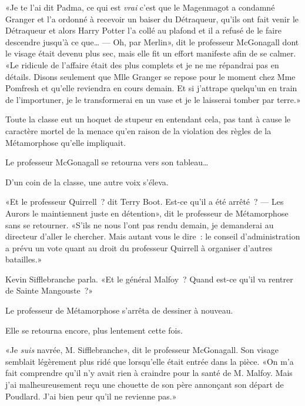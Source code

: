«Je te l'ai dit Padma, ce qui est \emph{vrai} c'est que le Magenmagot a condamné Granger et l'a ordonné à recevoir un baiser du Détraqueur, qu'ils ont fait venir le Détraqueur et alors Harry Potter l'a collé au plafond et il a refusé de le faire descendre jusqu'à ce que…
---  Oh, par Merlin», dit le professeur McGonagall dont le visage était devenu plus sec, mais elle fit un effort manifeste afin de se calmer. «Le ridicule de l'affaire était des plus complets et je ne me répandrai pas en détails. Disons seulement que Mlle Granger se repose pour le moment chez Mme Pomfresh et qu'elle reviendra en cours demain. Et si j'attrape quelqu'un en train de l'importuner, je le transformerai en un vase et je le laisserai tomber par terre.»

Toute la classe eut un hoquet de stupeur en entendant cela, pas tant à cause le caractère mortel de la menace qu'en raison de la violation des règles de la Métamorphose qu'elle impliquait.

Le professeur McGonagall se retourna vers son tableau…

D'un coin de la classe, une autre voix s'éleva.

«Et le professeur Quirrell~? dit Terry Boot. Est-ce qu'il a été arrêté~?
---  Les Aurors le maintiennent juste en détention», dit le professeur de Métamorphose sans se retourner. «S'ils ne nous l'ont pas rendu demain, je demanderai au directeur d'aller le chercher. Mais autant vous le dire~: le conseil d'administration a prévu un vote quant au droit du professeur Quirrell à organiser d'autres batailles.»

Kevin Sifflebranche parla. «Et le général Malfoy~? Quand est-ce qu'il va rentrer de Sainte Mangouste~?»

Le professeur de Métamorphose s'arrêta de dessiner à nouveau.

Elle se retourna encore, plus lentement cette fois.

«Je \emph{suis} navrée, M. Sifflebranche», dit le professeur McGonagall. Son visage semblait légèrement plus ridé que lorsqu'elle était entrée dans la pièce. «On m'a fait comprendre qu'il n'y avait rien à craindre pour la santé de M. Malfoy. Mais j'ai malheureusement reçu une chouette de son père annonçant son départ de Poudlard. J'ai bien peur qu'il ne revienne pas.»
